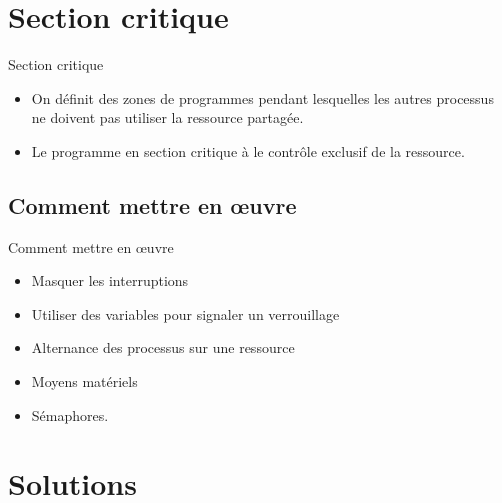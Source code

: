 \def\sectitle{Section critique}
\section{\sectitle}
\begin{frame}{\sectitle}
\begin{block}{\subsectitle}
\begin{itemize}
\item On définit des zones de programmes pendant lesquelles les autres processus
ne doivent pas utiliser la ressource partagée.
\item Le programme en section critique à le contrôle exclusif de la ressource.
\end{itemize}
\end{block}

\def\subsectitle{Comment mettre en {\oe}uvre}
\subsection{\subsectitle}
\begin{block}{\subsectitle}
\begin{itemize}
\item Masquer les interruptions
\item Utiliser des variables pour signaler un verrouillage
\item Alternance des processus sur une ressource
\item Moyens matériels
\item Sémaphores.
\end{itemize}
\end{block}

\end{frame}

\def\sectitle{Solutions}
\section{\sectitle}
\def\subsectitle{Exclusion mutuelle}
